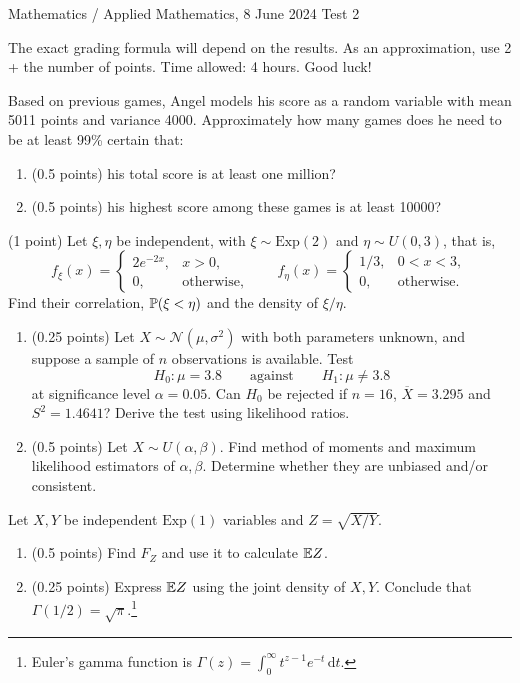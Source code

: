 \documentclass[a4paper]{report}
\begin{document}
\noindent Mathematics / Applied Mathematics, 8 June 2024 \hfill Test 2
\hrulefill
\begin{it}The exact grading formula will depend on the results. As an approximation, use 2 + the number of points. Time allowed: 4 hours. Good luck!\end{it}
\begin{problem}
Based on previous games, Angel models his score as a random variable with mean 5011 points and variance 4000. Approximately how many games does he need to be at least 99\% certain that:
\begin{enumerate}
\item (0.5 points) his total score is at least one million?
\item (0.5 points) his highest score among these games is at least 10000?
\end{enumerate}
\end{problem}
\begin{problem} (1 point)
Let $\xi,\eta$ be independent, with $\xi\sim\mathrm{Exp}(2)$ and $\eta\sim U(0,3)$, that is,
\[f_\xi(x)=\begin{cases}2e^{-2x},&x>0,\\0,&\text{otherwise,}\end{cases}\qquad
f_\eta(x)=\begin{cases}1/3,&0<x<3,\\0,&\text{otherwise.}\end{cases}\]
Find their correlation, $\P(\xi<\eta)$ and the density of $\xi/\eta$.
\end{problem}
\begin{problem}
\begin{enumerate}
\item (0.25 points) Let $X\sim\mathcal N(\mu,\sigma^2)$ with both parameters unknown, and suppose a sample of $n$ observations is available. Test
\[H_0:\mu=3.8\qquad\text{against}\qquad H_1:\mu\neq3.8\]
at significance level $\alpha=0.05$. Can $H_0$ be rejected if $n=16$, $\overline X=3.295$ and $S^2=1.4641$? Derive the test using likelihood ratios.
\item (0.5 points) Let $X\sim U(\alpha,\beta)$. Find method of moments and maximum likelihood estimators of $\alpha,\beta$. Determine whether they are unbiased and/or consistent.
\end{enumerate}
\end{problem}
\begin{problem}
Let $X,Y$ be independent $\mathrm{Exp}(1)$ variables and $Z=\sqrt{X/Y}$.
\begin{enumerate}
\item (0.5 points) Find $F_Z$ and use it to calculate $\E Z$.
\item (0.25 points) Express $\E Z$ using the joint density of $X,Y$. Conclude that $\Gamma(1/2)=\sqrt\pi$.\footnote{Euler's gamma function is $\Gamma(z)=\int_0^\infty t^{z-1}e^{-t}\,\mathrm dt$.}
\end{enumerate}
\end{problem}
\end{document}
